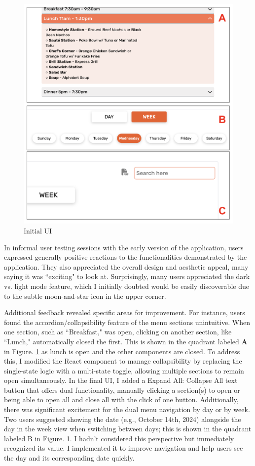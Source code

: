\documentclass[10pt,twocolumn]{article}
\begin{document}
    \begin{figure}
    \centering
    \includegraphics[width=.95\linewidth]{images/testing-Ui.png} %
    \caption{
        Initial UI 
    }\label{initial-UI}
\end{figure}

In informal user testing sessions with the early version of the application, users expressed generally positive reactions to the functionalities demonstrated by the application. They also appreciated the overall design and aesthetic appeal, many saying it was ``exciting" to look at. Surprisingly, many users appreciated the dark vs. light mode feature, which I initially doubted would be easily discoverable due to the subtle moon-and-star icon in the upper corner. 

Additional feedback revealed specific areas for improvement. For instance, users found the accordion/collapsibility feature of the menu sections unintuitive. When one section, such as ``Breakfast," was open, clicking on another section, like ``Lunch," automatically closed the first. This is shown in the quadrant labeled \textbf{A} in Figure. \ref{initial-UI} as lunch is open and the other components are closed. To address this, I modified the React component to manage collapsibility by replacing the single-state logic with a multi-state toggle, allowing multiple sections to remain open simultaneously. In the final UI, I added a Expand All: Collapse All text button that offers dual functionality, manually clicking a section(s) to open or being able to open all and close all with the click of one button. Additionally,  there was significant excitement for the dual menu navigation by day or by week. Two users suggested showing the date (e.g., October 14th, 2024) alongside the day in the week view when switching between days; this is shown in the quadrant labeled B in Figure. \ref{initial-UI}. I hadn’t considered this perspective but immediately recognized its value. I implemented it to improve navigation and help users see the day and its corresponding date quickly.
\end{document}
